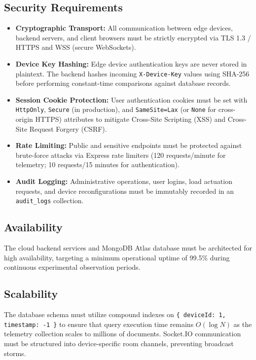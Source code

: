 \subsection{Security Requirements}
\begin{itemize}
    \item \textbf{Cryptographic Transport:} All communication between edge devices, backend servers, and client browsers must be strictly encrypted via TLS 1.3 / HTTPS and WSS (secure WebSockets).
    \item \textbf{Device Key Hashing:} Edge device authentication keys are never stored in plaintext. The backend hashes incoming \texttt{X-Device-Key} values using SHA-256 before performing constant-time comparisons against database records.
    \item \textbf{Session Cookie Protection:} User authentication cookies must be set with \texttt{HttpOnly}, \texttt{Secure} (in production), and \texttt{SameSite=Lax} (or \texttt{None} for cross-origin HTTPS) attributes to mitigate Cross-Site Scripting (XSS) and Cross-Site Request Forgery (CSRF).
    \item \textbf{Rate Limiting:} Public and sensitive endpoints must be protected against brute-force attacks via Express rate limiters (120 requests/minute for telemetry; 10 requests/15 minutes for authentication).
    \item \textbf{Audit Logging:} Administrative operations, user logins, load actuation requests, and device reconfigurations must be immutably recorded in an \texttt{audit\_logs} collection.
\end{itemize}

\subsection{Availability}
The cloud backend services and MongoDB Atlas database must be architected for high availability, targeting a minimum operational uptime of 99.5\% during continuous experimental observation periods.

\subsection{Scalability}
The database schema must utilize compound indexes on \texttt{\{ deviceId: 1, timestamp: -1 \}} to ensure that query execution time remains $O(\log N)$ as the telemetry collection scales to millions of documents. Socket.IO communication must be structured into device-specific room channels, preventing broadcast storms.

